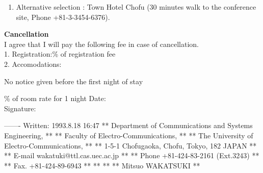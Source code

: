 \begin{small}
{\begin{enumerate}
\item Alternative selection :
Town Hotel Chofu (30 minutes walk to the conference site, Phone +81-3-3454-6376).
\end{enumerate}
}
\vspace{3mm}
\noindent
{\normalsize {\bf Cancellation}}\\
\noindent
I agree that I will pay the following fee in case of cancellation.\\
1. Registration:\hspace{15mm}\% of registration fee\\
2. Accomodations:\par
\hspace{7mm} No notice given before the first night of stay\par
\hspace{35mm} \% of room rate for 1 night
\vfill
\noindent
Date: \hspace{6mm} \underline{\hspace{20mm}} \hspace{5mm}\vspace{3mm}\\
\noindent
Signature: \underline{\hspace{70mm}}
\end{small}


-------                             Written: 1993.8.18 16:47
**  Department of Communications and Systems Engineering, **
 **          Faculty of Electro-Communications,          **
  **      The University of Electro-Communications,     **
   **     1-5-1 Chofugaoka, Chofu, Tokyo, 182 JAPAN    **
    **        E-mail wakatuki@ttl.cas.uec.ac.jp       **
   **         Phone  +81-424-83-2161 (Ext.3243)        **
  **          Fax.   +81-424-89-6943                    **
 **                                                      **
**                    Mitsuo WAKATSUKI                    **



